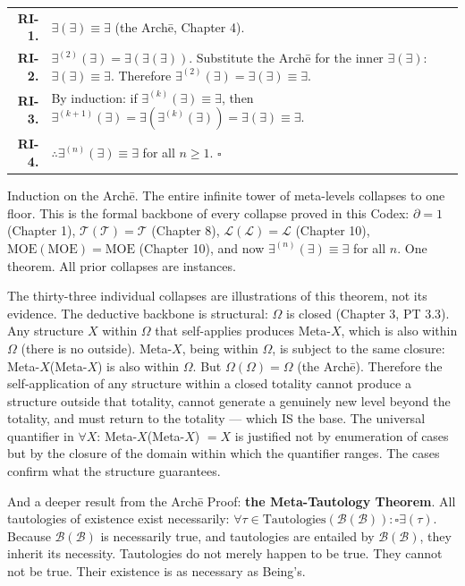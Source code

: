 \documentclass[10pt, openany, oneside]{book}
\renewcommand{\footnotesize}{\fontsize{8.5}{11}\selectfont}
\begin{document}
{\footnotesize
\noindent\begin{tabular}{r p{}}
\textbf{RI-1.} & $\exists(\exists) \equiv \exists$ (the Arch\={e}, Chapter 4). \\[0.3em]
\textbf{RI-2.} & $\exists^{(2)}(\exists) = \exists(\exists(\exists))$. Substitute the Arch\={e} for the inner $\exists(\exists)$: $\exists(\exists) \equiv \exists$. Therefore $\exists^{(2)}(\exists) = \exists(\exists) \equiv \exists$. \\[0.3em]
\textbf{RI-3.} & By induction: if $\exists^{(k)}(\exists) \equiv \exists$, then $\exists^{(k+1)}(\exists) = \exists(\exists^{(k)}(\exists)) = \exists(\exists) \equiv \exists$. \\[0.3em]
\textbf{RI-4.} & $\therefore \exists^{(n)}(\exists) \equiv \exists$ for all $n \geq 1$. $\square$ \\[0.3em]
\end{tabular}
}

\vspace{0.8em}

\noindent Induction on the Arch\={e}. The entire infinite tower of meta-levels collapses to one floor. This is the formal backbone of every collapse proved in this Codex: $\partial = 1$ (Chapter 1), $\mathcal{T}(\mathcal{T}) = \mathcal{T}$ (Chapter 8), $\mathcal{L}(\mathcal{L}) = \mathcal{L}$ (Chapter 10), $\text{MOE}(\text{MOE}) = \text{MOE}$ (Chapter 10), and now $\exists^{(n)}(\exists) \equiv \exists$ for all $n$. One theorem. All prior collapses are instances.

The thirty-three individual collapses are illustrations of this theorem, not its evidence. The deductive backbone is structural: $\Omega$ is closed (Chapter 3, PT 3.3). Any structure $X$ within $\Omega$ that self-applies produces Meta-$X$, which is also within $\Omega$ (there is no outside). Meta-$X$, being within $\Omega$, is subject to the same closure: Meta-$X$(Meta-$X$) is also within $\Omega$. But $\Omega(\Omega) = \Omega$ (the Arch\={e}). Therefore the self-application of any structure within a closed totality cannot produce a structure outside that totality, cannot generate a genuinely new level beyond the totality, and must return to the totality --- which IS the base. The universal quantifier in $\forall X$: Meta-$X$(Meta-$X$) $= X$ is justified not by enumeration of cases but by the closure of the domain within which the quantifier ranges. The cases confirm what the structure guarantees.

And a deeper result from the Arch\={e} Proof: \textbf{the Meta-Tautology Theorem}. All tautologies of existence exist necessarily: $\forall \tau \in \text{Tautologies}(\mathcal{B}(\mathcal{B})): \square\exists(\tau)$. Because $\mathcal{B}(\mathcal{B})$ is necessarily true, and tautologies are entailed by $\mathcal{B}(\mathcal{B})$, they inherit its necessity. Tautologies do not merely happen to be true. They cannot not be true. Their existence is as necessary as Being's.
\end{document}
